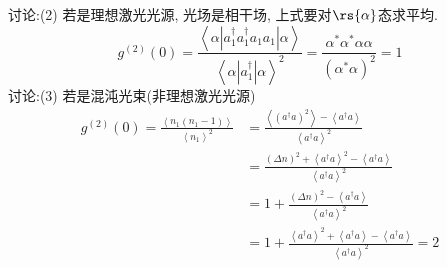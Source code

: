    \begin{frame}
    \frametitle{}
    讨论:(2) 若是理想激光光源, 光场是相干场, 上式要对$\rs{\alpha}$态求平均. 
    \[ g^{(2)}(0) = \frac{\left\langle \alpha | a^{\dagger} _{1}a^{\dagger} _{1}a_{1}a_{1} | \alpha  \right\rangle}{ \left\langle \alpha |a^{\dagger} _{1} | \alpha\right\rangle ^2} =  \frac{\alpha^* \alpha^* \alpha \alpha }{(\alpha^* \alpha)^2 } = 1 \] 
    讨论:(3) 若是混沌光束(非理想激光光源)
    \[\begin{aligned}
        g^{(2)}(0) = \frac{\left\langle n_1(n_1-1) \right\rangle}{\left\langle n_1 \right\rangle^2 } &=\frac{\left\langle  (a^{\dagger}a)^2 \right\rangle - \left\langle a^{\dagger}a  \right\rangle}{ \left\langle  a^{\dagger} a \right\rangle ^2} \\
        &=\frac{(\Delta n)^2 + \left\langle  a^{\dagger} a \right\rangle ^2 - \left\langle a^{\dagger}a  \right\rangle}{ \left\langle  a^{\dagger} a \right\rangle ^2} \\
        &= 1 + \frac{(\Delta n)^2 - \left\langle a^{\dagger}a  \right\rangle}{ \left\langle  a^{\dagger} a \right\rangle ^2} \\ 
        &= 1 + \frac{\left\langle  a^{\dagger} a \right\rangle ^2 + \left\langle a^{\dagger}a  \right\rangle - \left\langle a^{\dagger}a  \right\rangle}{ \left\langle  a^{\dagger} a \right\rangle ^2} =2     
    \end{aligned} \]
\end{frame}

